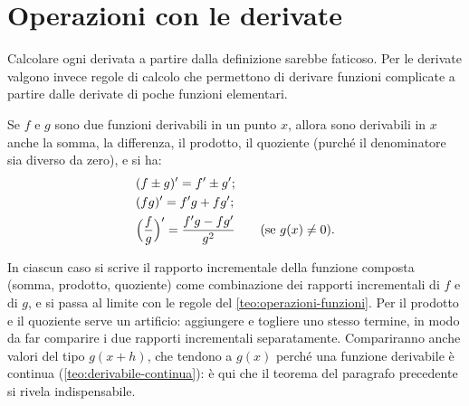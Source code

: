 \section{Operazioni con le derivate}
\label{sec:operazioni-derivate}

Calcolare ogni derivata a partire dalla definizione sarebbe faticoso. Per le derivate
valgono invece regole di calcolo che permettono di derivare funzioni complicate a partire
dalle derivate di poche funzioni elementari.

\begin{teorema}\label{teo:operazioni-derivate}
Se $f$ e $g$ sono due funzioni derivabili in un punto $x$, allora sono derivabili in $x$
anche la somma, la differenza, il prodotto, il quoziente (purché il denominatore sia
diverso da zero), e si ha:
\begin{align}
  &(f\pm g)'=f'\pm g'; \label{eq:derivata-somma}\\
  &(fg)'=f'g+fg'; \label{eq:derivata-prodotto}\\
  &\Bigl(\frac fg\Bigr)'=\frac{f'g-fg'}{g^{2}} \qquad(\text{se } g(x)\neq0). \label{eq:derivata-quoziente}
\end{align}
\end{teorema}

\begin{schema}
\end{schema}

\begin{strategia}
In ciascun caso si scrive il rapporto incrementale della funzione composta (somma,
prodotto, quoziente) come combinazione dei rapporti incrementali di $f$ e di $g$, e si
passa al limite con le regole del \cref{teo:operazioni-funzioni}. Per il prodotto e il
quoziente serve un artificio: aggiungere e togliere uno stesso termine, in modo da far
comparire i due rapporti incrementali separatamente. Compariranno anche valori del tipo
$g(x+h)$, che tendono a $g(x)$ perché una funzione derivabile è continua
(\cref{teo:derivabile-continua}): è qui che il teorema del paragrafo precedente si rivela
indispensabile.
\end{strategia}

